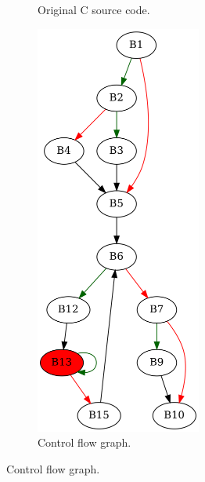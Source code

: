 \begin{figure}[htbp]
	\centering
	\begin{subfigure}[b]{0.30\textwidth}
		\centering
		
		\caption{Original C source code.}
	\end{subfigure}
	\begin{subfigure}[b]{0.50\textwidth}
		\centering
		\includegraphics[width=0.6\textwidth]{inc/appendices/examples/interval/example/sample/f_0002b.png}
		\caption{Control flow graph.}
	\end{subfigure}
\end{figure}

